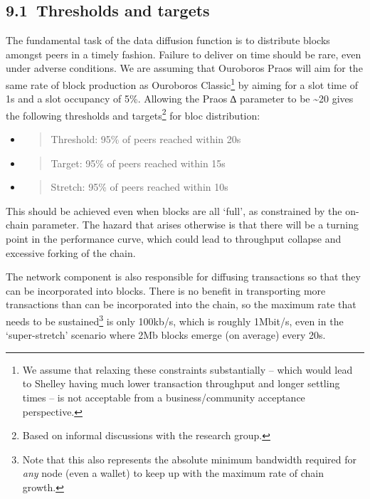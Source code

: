 \documentclass[]{article}
\begin{document}
\hypertarget{thresholds-and-targets}{%
\subsection{​9.1​~Thresholds and targets}\label{thresholds-and-targets}}

The fundamental task of the data diffusion function is to distribute
blocks amongst peers in a timely fashion. Failure to deliver on time
should be rare, even under adverse conditions. We are assuming that
Ouroboros Praos will aim for the same rate of block production as
Ouroboros Classic\footnote{We assume that relaxing these constraints
  substantially -- which would lead to Shelley having much lower
  transaction throughput and longer settling times -- is not acceptable
  from a business/community acceptance perspective.} by aiming for a
slot time of 1s and a slot occupancy of 5\%. Allowing the Praos ∆
parameter to be \textasciitilde{}20 gives the following thresholds and
targets\footnote{Based on informal discussions with the research group.}
for bloc distribution:

\begin{itemize}
\item
  \begin{quote}
  Threshold: 95\% of peers reached within 20s
  \end{quote}
\item
  \begin{quote}
  Target: 95\% of peers reached within 15s
  \end{quote}
\item
  \begin{quote}
  Stretch: 95\% of peers reached within 10s
  \end{quote}
\end{itemize}

This should be achieved even when blocks are all `full', as constrained
by the on-chain parameter. The hazard that arises otherwise is that
there will be a turning point in the performance curve, which could lead
to throughput collapse and excessive forking of the chain.

The network component is also responsible for diffusing transactions so
that they can be incorporated into blocks. There is no benefit in
transporting more transactions than can be incorporated into the chain,
so the maximum rate that needs to be sustained\footnote{Note that this
  also represents the absolute minimum bandwidth required for \emph{any}
  node (even a wallet) to keep up with the maximum rate of chain growth.}
is only 100kb/s, which is roughly 1Mbit/s, even in the `super-stretch'
scenario where 2Mb blocks emerge (on average) every 20s.
\end{document}
